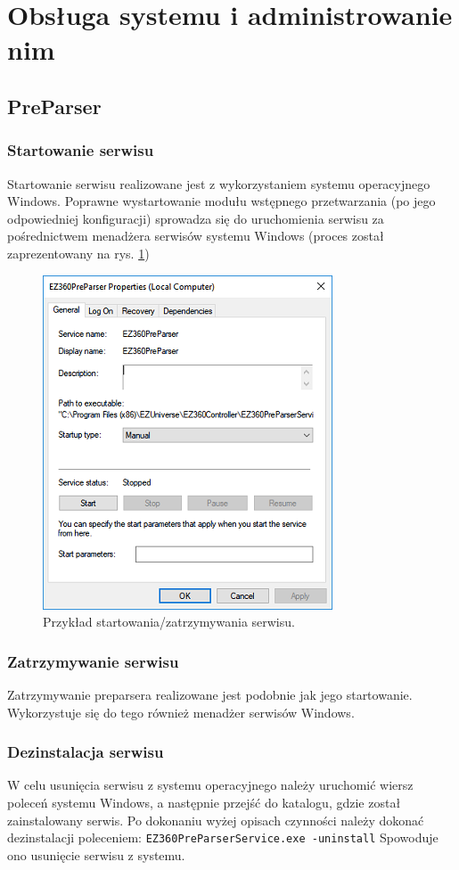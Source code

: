 \documentclass[a4paper]{book}
\begin{document}
\section{Obsługa systemu i administrowanie nim}
\subsection{PreParser}
\subsubsection{Startowanie serwisu}
Startowanie serwisu realizowane jest z wykorzystaniem systemu operacyjnego Windows. Poprawne wystartowanie modułu wstępnego przetwarzania (po jego odpowiedniej konfiguracji) sprowadza się do uruchomienia serwisu za pośrednictwem menadżera serwisów systemu Windows (proces został zaprezentowany na rys. \ref{fig:startowanie_serwisu})
\begin{figure}[t]
	\centering
	\includegraphics{./img/startowanie_serwisu.png}
	\caption{Przykład startowania/zatrzymywania serwisu.}
	\label{fig:startowanie_serwisu}
\end{figure}
\subsubsection{Zatrzymywanie serwisu}
Zatrzymywanie preparsera realizowane jest podobnie jak jego startowanie. Wykorzystuje się do tego również menadżer serwisów Windows.
\subsubsection{Dezinstalacja serwisu}
W celu usunięcia serwisu z systemu operacyjnego należy uruchomić wiersz poleceń systemu Windows, a następnie przejść do katalogu, gdzie został zainstalowany serwis. Po dokonaniu wyżej opisach czynności należy dokonać dezinstalacji poleceniem: \newline
\texttt{EZ360PreParserService.exe -uninstall}
\newline Spowoduje ono usunięcie serwisu z systemu. 
\end{document}
